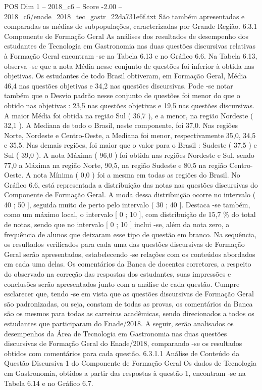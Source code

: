 \begin{textsample}{POS Dim 1 – 2018\_c6 – Score -2.00 – 2018\_c6/enade\_2018\_tec\_gastr\_22da731e6f.txt}
São também apresentadas e comparadas as médias de subpopulações, caracterizadas por Grande Região. 6.3.1 Componente de Formação Geral As análises dos resultados de desempenho dos estudantes de Tecnologia em Gastronomia nas duas questões discursivas relativas à Formação Geral encontram -se na Tabela 6.13 e no Gráfico 6.6.
Na Tabela 6.13, observa -se que a nota Média nesse conjunto de questões foi inferior à obtida nas objetivas.
Os estudantes de todo Brasil obtiveram, em Formação Geral, Média 46,4 nas questões objetivas e 34,2 nas questões discursivas.
Pode -se notar também que o Desvio padrão nesse conjunto de questões foi menor do que o obtido nas objetivas : 23,5 nas questões objetivas e 19,5 nas questões discursivas.
A maior Média foi obtida na região Sul ( 36,7 ), e a menor, na região Nordeste ( 32,1 ).
A Mediana de todo o Brasil, neste componente, foi 37,0.
Nas regiões Norte, Nordeste e Centro-Oeste, a Mediana foi menor, respectivamente 35,0, 34,5 e 35,5.
Nas demais regiões, foi maior que o valor para o Brasil : Sudeste ( 37,5 ) e Sul ( 39,0 ).
A nota Máxima ( 96,0 ) foi obtida nas regiões Nordeste e Sul, sendo 77,0 a Máxima na região Norte, 90,5, na região Sudeste e 80,5 na região Centro-Oeste.
A nota Mínima ( 0,0 ) foi a mesma em todas as regiões do Brasil.
No Gráfico 6.6, está representada a distribuição das notas nas questões discursivas do Componente de Formação Geral.
A moda dessa distribuição ocorre no intervalo ( 40 ; 50 ], seguida muito de perto pelo intervalo ( 30 ; 40 ].
Destaca -se também, como um máximo local, o intervalo [ 0 ; 10 ], com distribuição de 15,7 \% do total de notas, sendo que no intervalo [ 0 ; 10 ] inclui -se, além da nota zero, a frequência de alunos que deixaram esse tipo de questão em branco.
Na sequência, os resultados verificados para cada uma das questões discursivas de Formação Geral serão apresentados, estabelecendo -se relações com os conteúdos abordados em cada uma delas.
Os comentários da Banca de docentes corretores, a respeito do observado na correção das respostas dos estudantes, suas impressões e conclusões serão apresentados junto com a análise de cada questão.
Cumpre esclarecer que, tendo -se em vista que as questões discursivas de Formação Geral são padronizadas, ou seja, constam de todas as provas, os comentários da Banca são os mesmos para todas as carreiras acadêmicas, sendo direcionados a todos os estudantes que participaram do Enade/2018.
A seguir, serão analisados os desempenhos da Área de Tecnologia em Gastronomia nas duas questões discursivas de Formação Geral do Enade/2018, comparando -se os resultados obtidos com comentários para cada questão. 6.3.1.1 Análise de Conteúdo da Questão Discursiva 1 do Componente de Formação Geral Os dados de Tecnologia em Gastronomia, obtidos a partir das respostas à questão 1, encontram -se na Tabela 6.14 e no Gráfico 6.7.

\end{textsample}

